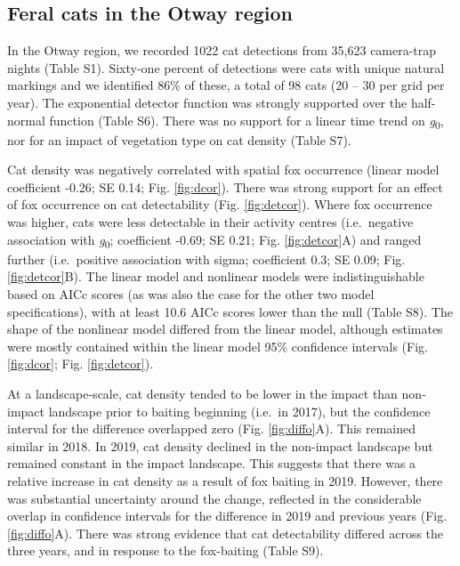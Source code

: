 \documentclass[]{elsarticle} %
\begin{document}
\hypertarget{feral-cats-in-the-otway-region}{%
\subsection{Feral cats in the Otway region}\label{feral-cats-in-the-otway-region}}

In the Otway region, we recorded 1022 cat detections from 35,623 camera-trap nights (Table S1). Sixty-one percent of detections were cats with unique natural markings and we identified 86\% of these, a total of 98 cats (20 -- 30 per grid per year). The exponential detector function was strongly supported over the half-normal function (Table S6). There was no support for a linear time trend on \emph{g}\textsubscript{0}, nor for an impact of vegetation type on cat density (Table S7).

Cat density was negatively correlated with spatial fox occurrence (linear model coefficient -0.26; SE 0.14; Fig. \ref{fig:dcor}). There was strong support for an effect of fox occurrence on cat detectability (Fig. \ref{fig:detcor}). Where fox occurrence was higher, cats were less detectable in their activity centres (i.e.~negative association with \emph{g}\textsubscript{0}; coefficient -0.69; SE 0.21; Fig. \ref{fig:detcor}A) and ranged further (i.e.~positive association with sigma; coefficient 0.3; SE 0.09; Fig. \ref{fig:detcor}B). The linear model and nonlinear models were indistinguishable based on AICc scores (as was also the case for the other two model specifications), with at least 10.6 AICc scores lower than the null (Table S8). The shape of the nonlinear model differed from the linear model, although estimates were mostly contained within the linear model 95\% confidence intervals (Fig. \ref{fig:dcor}; Fig. \ref{fig:detcor}).

At a landscape-scale, cat density tended to be lower in the impact than non-impact landscape prior to baiting beginning (i.e.~in 2017), but the confidence interval for the difference overlapped zero (Fig. \ref{fig:diffo}A). This remained similar in 2018. In 2019, cat density declined in the non-impact landscape but remained constant in the impact landscape. This suggests that there was a relative increase in cat density as a result of fox baiting in 2019. However, there was substantial uncertainty around the change, reflected in the considerable overlap in confidence intervals for the difference in 2019 and previous years (Fig. \ref{fig:diffo}A). There was strong evidence that cat detectability differed across the three years, and in response to the fox-baiting (Table S9).
\end{document}
